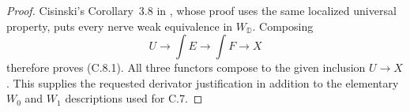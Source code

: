 \begin{proof}
Cisinski's Corollary~3.8 in \cite{CDCisinski2009}, whose proof
uses the same localized universal property, puts every nerve
weak equivalence in $W_{\mathbb D}$. Composing
\[
 U\longrightarrow\int E\longrightarrow\int F
 \longrightarrow X
\]
therefore proves (C.8.1). All three functors compose to the
given inclusion $U\to X$. This supplies the requested
derivator justification in addition to the elementary $W_0$
and $W_1$ descriptions used for C.7.
\end{proof}
